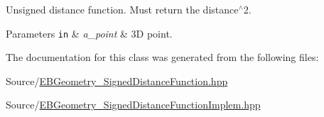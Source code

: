 Unsigned distance function. Must return the distance$^\wedge$2. 


\begin{DoxyParams}[1]{Parameters}
\mbox{\tt in}  & {\em a\+\_\+point} & 3D point. \\
\hline
\end{DoxyParams}


The documentation for this class was generated from the following files\+:\begin{DoxyCompactItemize}
\item 
Source/\hyperlink{EBGeometry__SignedDistanceFunction_8hpp}{E\+B\+Geometry\+\_\+\+Signed\+Distance\+Function.\+hpp}\item 
Source/\hyperlink{EBGeometry__SignedDistanceFunctionImplem_8hpp}{E\+B\+Geometry\+\_\+\+Signed\+Distance\+Function\+Implem.\+hpp}\end{DoxyCompactItemize}
